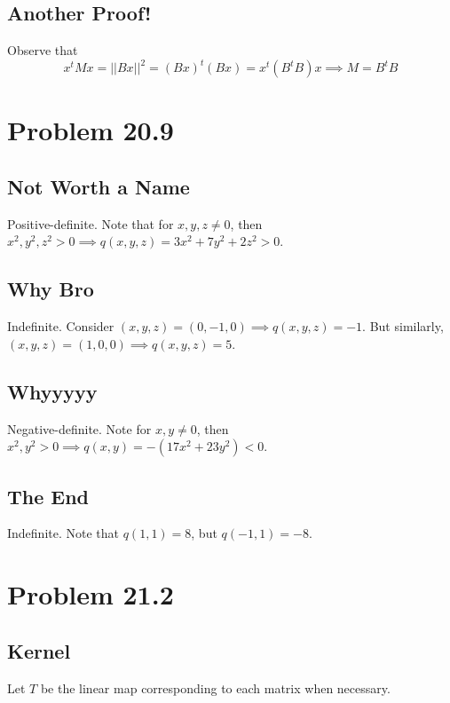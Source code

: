\documentclass{article}
\theoremstyle{named}
\begin{document}
\subsection{Another Proof!}

Observe that 
\[
    x^t M x = ||Bx||^2 = (Bx)^t (Bx) = x^t (B^t B) x \implies M = B^t B
\]

\section{Problem 20.9}

\subsection{Not Worth a Name}

Positive-definite. Note that for $x, y, z \neq 0$, then $x^2, y^2, z^2 > 0 \implies q(x, y, z) = 3x^2 + 7y^2 + 2z^2 > 0$. 

\subsection{Why Bro}

Indefinite. Consider $(x, y, z) = (0, -1, 0) \implies q(x, y, z) = -1$. But similarly, $(x, y, z) = (1, 0, 0) \implies q(x, y, z) = 5$.

\subsection{Whyyyyy}

Negative-definite. Note for $x, y \neq 0$, then $x^2, y^2 > 0 \implies q(x, y) = -(17x^2 + 23y^2) < 0$. 

\subsection{The End}

Indefinite. Note that $q(1, 1) = 8$, but $q(-1, 1) = -8$. 

\section{Problem 21.2}

\subsection{Kernel}

Let $T$ be the linear map corresponding to each matrix when necessary. 
\end{document}
